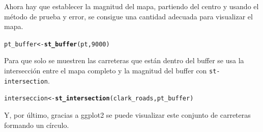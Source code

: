 \documentclass{article}\usepackage[]{graphicx}\usepackage[]{color}
\makeatletter
\newcommand{\hlnum}[1]{\textcolor[rgb]{0.686,0.059,0.569}{#1}}%
\newcommand{\hlstd}[1]{\textcolor[rgb]{0.345,0.345,0.345}{#1}}%
\newcommand{\hlkwb}[1]{\textcolor[rgb]{0.69,0.353,0.396}{#1}}%
\newcommand{\hlkwd}[1]{\textcolor[rgb]{0.737,0.353,0.396}{\textbf{#1}}}%
\newenvironment{kframe}{%
 \def\at@end@of@kframe{}%
 \ifinner\ifhmode%
  \def\at@end@of@kframe{\end{minipage}}%
  \begin{minipage}{\columnwidth}%
 \fi\fi%
 \def\FrameCommand##1{\hskip\@totalleftmargin \hskip-\fboxsep
 \colorbox{shadecolor}{##1}\hskip-\fboxsep
     \hskip-\linewidth \hskip-\@totalleftmargin \hskip\columnwidth}%
 \MakeFramed {\advance\hsize-\width
   \@totalleftmargin\z@ \linewidth\hsize
   \@setminipage}}%
 {\par\unskip\endMakeFramed%
 \at@end@of@kframe}
\newenvironment{knitrout}{}{} %
\makeatother
\begin{document}
Ahora hay que establecer la magnitud del mapa, partiendo del centro y usando el m\'etodo de prueba y error, se consigue una cantidad adecuada para visualizar el mapa.
\begin{knitrout}
\color{fgcolor}\begin{kframe}
\begin{alltt}
\hlstd{pt_buffer} \hlkwb{<-} \hlkwd{st_buffer}\hlstd{(pt,}\hlnum{9000}\hlstd{)}
\end{alltt}
\end{kframe}
\end{knitrout}
Para que solo se muestren las carreteras que est\'an dentro del buffer se usa la intersecci\'on entre el mapa completo y la magnitud del buffer con \texttt{st-intersection}.
\begin{knitrout}
\color{fgcolor}\begin{kframe}
\begin{alltt}
\hlstd{interseccion} \hlkwb{<-} \hlkwd{st_intersection}\hlstd{(clark_roads, pt_buffer)}
\end{alltt}
\end{kframe}
\end{knitrout}
Y, por \'ultimo, gracias a ggplot2 se puede visualizar este conjunto de carreteras formando un c\'irculo.
\end{document}
